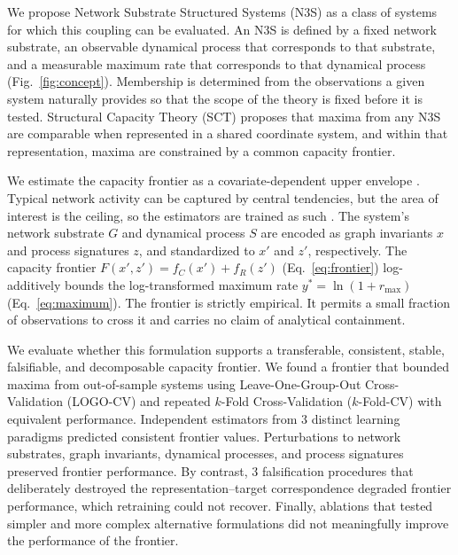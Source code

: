 \documentclass{article}
\begin{document}
We propose Network Substrate Structured Systems (N3S) as a class of systems for which this coupling can be evaluated. An N3S is defined by a fixed network substrate, an observable dynamical process that corresponds to that substrate, and a measurable maximum rate that corresponds to that dynamical process (Fig.~\ref{fig:concept}). Membership is determined from the observations a given system naturally provides so that the scope of the theory is fixed before it is tested. Structural Capacity Theory (SCT) proposes that maxima from any N3S are comparable when represented in a shared coordinate system, and within that representation, maxima are constrained by a common capacity frontier.

We estimate the capacity frontier as a covariate-dependent upper envelope \citep{ref103,ref111}. Typical network activity can be captured by central tendencies, but the area of interest is the ceiling, so the estimators are trained as such \citep{ref19,ref20,ref21,ref22,ref23,ref31,ref29}. The system's network substrate $G$ and dynamical process $S$ are encoded as graph invariants $x$ and process signatures $z$, and standardized to $x'$ and $z'$, respectively. The capacity frontier $F(x', z') = f_C(x') + f_R(z')$ (Eq.~\eqref{eq:frontier}) log-additively bounds the log-transformed maximum rate $y^* = \ln(1 + r_{\max})$ (Eq.~\eqref{eq:maximum}). The frontier is strictly empirical. It permits a small fraction of observations to cross it and carries no claim of analytical containment.

We evaluate whether this formulation supports a transferable, consistent, stable, falsifiable, and decomposable capacity frontier. We found a frontier that bounded maxima from out-of-sample systems using Leave-One-Group-Out Cross-Validation (LOGO-CV) and repeated $k$-Fold Cross-Validation ($k$-Fold-CV) with equivalent performance. Independent estimators from 3 distinct learning paradigms predicted consistent frontier values. Perturbations to network substrates, graph invariants, dynamical processes, and process signatures preserved frontier performance. By contrast, 3 falsification procedures that deliberately destroyed the representation–target correspondence degraded frontier performance, which retraining could not recover. Finally, ablations that tested simpler and more complex alternative formulations did not meaningfully improve the performance of the frontier.
\end{document}
